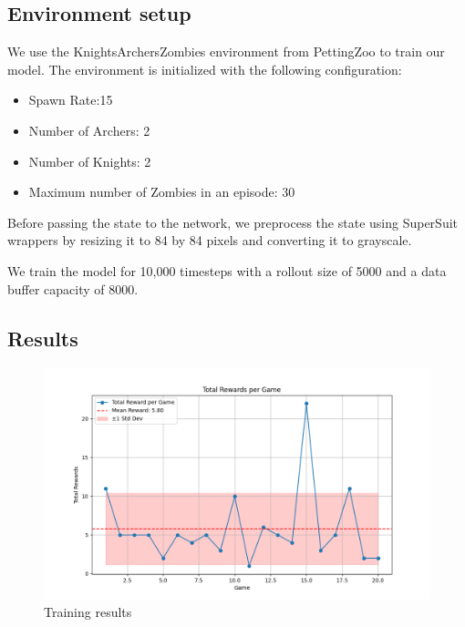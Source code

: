 \documentclass{article}
\begin{document}

\subsection{Environment setup}
We use the KnightsArchersZombies environment from PettingZoo to train our model. The environment is initialized with
the following configuration:
\begin{itemize}
  \item Spawn Rate:15
  \item Number of Archers: 2
  \item Number of Knights: 2
  \item Maximum number of Zombies in an episode: 30
\end{itemize}

Before passing the state to the network, we preprocess the state using SuperSuit \cite{SuperSuit} wrappers by resizing it to 84 by 84 pixels and
converting it to grayscale.

We train the model for 10,000 timesteps with a rollout size of 5000 and a data buffer capacity of 8000.


\subsection{Results}

\begin{figure}[h]
  \centering
  \includegraphics[scale=0.4]{rewards2.png}
  \caption{Training results}
  \label{fig:training_results_no_temporal}
\end{figure}
\end{document}
